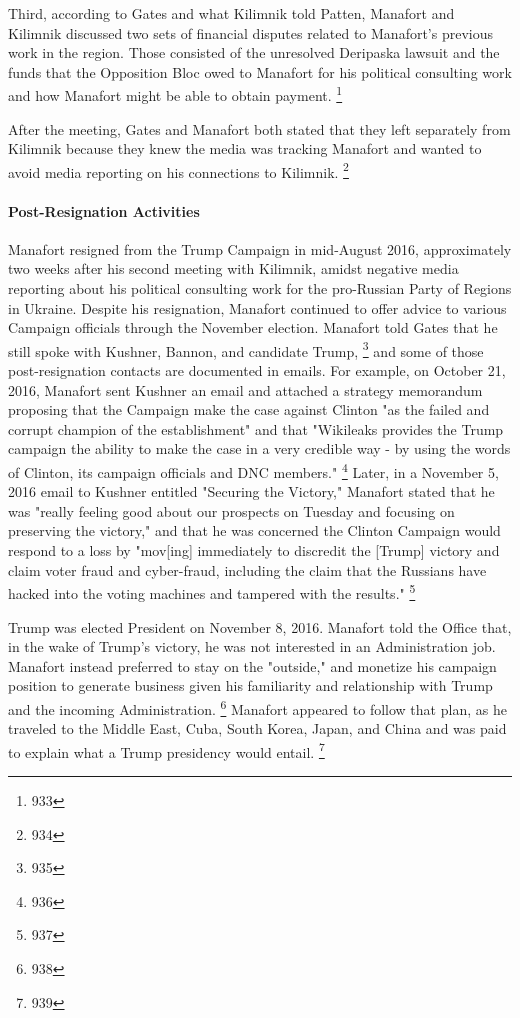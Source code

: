 Third, according to Gates and what Kilimnik told Patten, Manafort and Kilimnik discussed two sets of financial disputes related to Manafort's previous work in the region.
Those consisted of the unresolved Deripaska lawsuit and the funds that the Opposition Bloc owed to Manafort for his political consulting work and how Manafort might be able to obtain payment.%
\footnote{933}

After the meeting, Gates and Manafort both stated that they left separately from Kilimnik because they knew the media was tracking Manafort and wanted to avoid media reporting on his connections to Kilimnik.%
\footnote{934}

\paragraph{Post-Resignation Activities}

Manafort resigned from the Trump Campaign in mid-August 2016, approximately two weeks after his second meeting with Kilimnik, amidst negative media reporting about his political consulting work for the pro-Russian Party of Regions in Ukraine.
Despite his resignation, Manafort continued to offer advice to various Campaign officials through the November election.
Manafort told Gates that he still spoke with Kushner, Bannon, and candidate Trump,%
\footnote{935}
and some of those post-resignation contacts are documented in emails.
For example, on October 21, 2016, Manafort sent Kushner an email and attached a strategy memorandum proposing that the Campaign make the case against Clinton "as the failed and corrupt champion of the establishment" and that "Wikileaks provides the Trump campaign the ability to make the case in a very credible way - by using the words of Clinton, its campaign officials and DNC members."%
\footnote{936}
Later, in a November 5, 2016 email to Kushner entitled "Securing the Victory," Manafort stated that he was "really feeling good about our prospects on Tuesday and focusing on preserving the victory," and that he was concerned the Clinton Campaign would respond to a loss by "mov[ing] immediately to discredit the [Trump] victory and claim voter fraud and cyber-fraud, including the claim that the Russians have hacked into the voting machines and tampered with the results."%
\footnote{937}

Trump was elected President on November 8, 2016.
Manafort told the Office that, in the wake of Trump's victory, he was not interested in an Administration job.
Manafort instead preferred to stay on the "outside," and monetize his campaign position to generate business given his familiarity and relationship with Trump and the incoming Administration.%
\footnote{938}
Manafort appeared to follow that plan, as he traveled to the Middle East, Cuba, South Korea, Japan, and China and was paid to explain what a Trump presidency would entail.%
\footnote{939}

